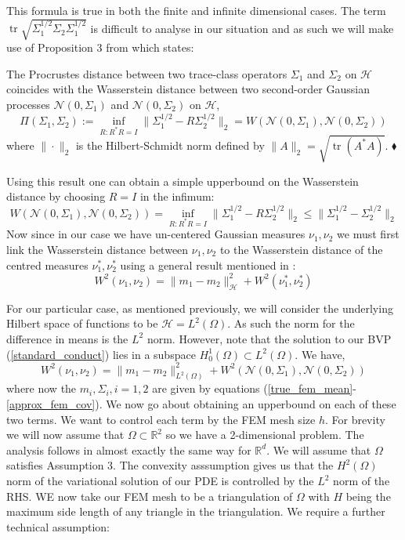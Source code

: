 This formula is true in both the finite and infinite dimensional cases. The term $\operatorname{tr}\sqrt{\Sigma_{1}^{1/2}\Sigma_{2}\Sigma_{1}^{1/2}}$ is difficult to analyse in our situation and as such we will make use of Proposition 3 from \textcolor{blue}{\cite{masarotto2019procrustes}} which states: \vspace{10pt}
\begin{proposition}
    The Procrustes distance between two trace-class operators $\Sigma_{1}$ and $\Sigma_{2}$ on $\mathcal{H}$ coincides with the Wasserstein distance between two second-order Gaussian processes $\mathcal{N}(0,\Sigma_{1})$ and $\mathcal{N}(0,\Sigma_2)$ on $\mathcal{H}$,
    $$\Pi(\Sigma_{1},\Sigma_{2}):=\inf_{R:R^{*}R=I}\|\Sigma_{1}^{1/2}-R\Sigma_{2}^{1/2}\|_{2}=W(\mathcal{N}(0,\Sigma_{1}),\mathcal{N}(0,\Sigma_{2}))$$
    where $\|\cdot\|_{2}$ is the Hilbert-Schmidt norm defined by $\|A\|_{2}=\sqrt{\operatorname{tr}(A^{*}A)}$. $\mathbin{\blacklozenge}$
\end{proposition}

Using this result one can obtain a simple upperbound on the Wasserstein distance by choosing $R=I$ in the infimum:
\begin{equation}
    W(\mathcal{N}(0,\Sigma_1),\mathcal{N}(0,\Sigma_2))=\inf_{R:R^{*}R=I}\|\Sigma_{1}^{1/2}-R\Sigma_{2}^{1/2}\|_{2} \leq \|\Sigma_{1}^{1/2}-\Sigma_{2}^{1/2}\|_{2}
\end{equation}
Now since in our case we have un-centered Gaussian measures $\nu_1,\nu_2$ we must first link the Wasserstein distance between $\nu_1,\nu_2$ to the Wasserstein distance of the centred measures $\nu_{1}^{*},\nu_{2}^{*}$ using a general result mentioned in \textcolor{blue}{\cite{cuesta1996lower}}:
\begin{equation}
    W^{2}(\nu_1,\nu_2)=\|m_1-m_2\|_{\mathcal{H}}^{2}+W^{2}(\nu_{1}^{*},\nu_{2}^{*})
\end{equation}

For our particular case, as mentioned previously, we will consider the underlying Hilbert space of functions to be $\mathcal{H}=L^2(\Omega)$. As such the norm for the difference in means is the $L^2$ norm. However, note that the solution to our BVP (\ref{standard_conduct}) lies in a subspace $H_{0}^{1}(\Omega)\subset L^{2}(\Omega)$. We have,
\begin{equation}
    W^{2}(\nu_1,\nu_2)=\|m_1-m_2\|_{L^{2}(\Omega)}^{2}+W^{2}(\mathcal{N}(0,\Sigma_1),\mathcal{N}(0,\Sigma_2))
\end{equation}
where now the $m_{i},\Sigma_{i}, i=1,2$ are given by equations (\ref{true_fem_mean}-\ref{approx_fem_cov}). We now go about obtaining an upperbound on each of these two terms. We want to control each term by the FEM mesh size $h$. For brevity we will now assume that $\Omega\subset\mathbb{R}^2$ so we have a 2-dimensional problem. The analysis follows in almost exactly the same way for $\mathbb{R}^{d}$. We will assume that $\Omega$ satisfies Assumption 3. The convexity asssumption gives us that the $H^{2}(\Omega)$ norm of the variational solution of our PDE is controlled by the $L^2$ norm of the RHS. WE now take our FEM mesh to be a triangulation of $\Omega$ with $H$ being the maximum side length of any triangle in the triangulation. We require a further technical assumption:

